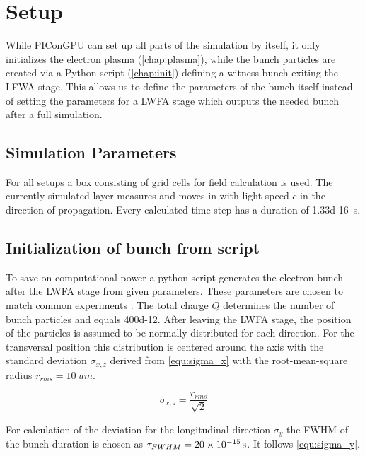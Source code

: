 \documentclass[bachelor_thesis]{subfiles}
\begin{document}
\chapter{Setup}
While PIConGPU can set up all parts of the simulation by itself, it only initializes the electron plasma (\autoref{chap:plasma}), while the bunch particles are created via a Python script (\autoref{chap:init}) defining a witness bunch exiting the LFWA stage.
This allows us to define the parameters of the bunch itself instead of setting the parameters for a LWFA stage which outputs the needed bunch after a full simulation.

\section{Simulation Parameters}
For all setups a box consisting of  grid cells for field calculation is used. The currently simulated layer measures  and moves in with light speed $c$ in the direction of propagation.
Every calculated time step has a duration of \qty{1.33d-16}{\s}. 



\section{Initialization of bunch from script}\label{chap:init}
To save on computational power a python script generates the electron bunch after the LWFA stage from given parameters. These parameters are chosen to match common experiments . The total charge $Q$ determines the number of bunch particles and equals \qty{400d-12}{\C}.
After leaving the LWFA stage, the position of the particles is assumed to be normally distributed for each direction. For the transversal position this distribution is centered around the axis with the standard deviation $\sigma_{x,z}$ derived from \autoref{equ:sigma_x} with the root-mean-square radius $r_{rms}=\qty{10}{um}$.

\begin{equation}
\sigma_{x,z}=\frac{r_{rms}}{\sqrt{2}} 
\label{equ:sigma_x}
\end{equation}

For calculation of the deviation for the longitudinal direction $\sigma_y$ the FWHM of the bunch duration is chosen as $\tau_{FWHM}=\qty{20d-15}{\s}$. It follows \autoref{equ:sigma_y}.
\end{document}
